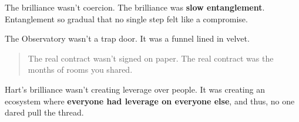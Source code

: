   



The brilliance wasn’t coercion.  The brilliance was \textbf{slow entanglement}. 
Entanglement so gradual that no single step felt like a compromise.

The Observatory wasn’t a trap door.  It was a funnel lined in velvet.

\begin{quote}
  The real contract wasn’t signed on paper.  The real contract was the months of rooms you shared.
\end{quote}

Hart’s brilliance wasn’t creating leverage over people. It was creating an ecosystem where 
\textbf{everyone had leverage on everyone else}, and thus, no one dared pull the thread.

\medskip

